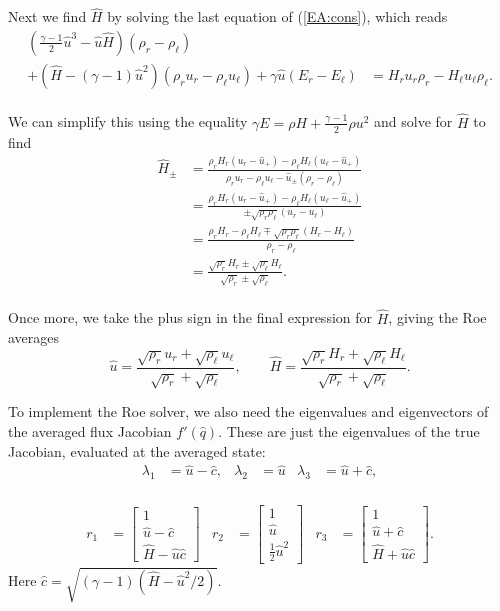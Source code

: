 \documentclass{SIAMbook2016}
\begin{document}
Next we find \(\hat{H}\) by solving the last equation of
(\ref{EA:cons}), which reads\\
\begin{align}
    \left( \frac{\gamma-1}{2}\hat{u}^3 - \hat{u}\hat{H} \right)(\rho_r - \rho_\ell) \\ + \left( \hat{H} - (\gamma-1)\hat{u}^2 \right)(\rho_r u_r - \rho_\ell u_\ell) + \gamma \hat{u}(E_r - E_\ell) & = H_r u_r \rho_r - H_\ell u_\ell \rho_\ell.
\end{align}\\
We can simplify this using the equality
\(\gamma E = \rho H + \frac{\gamma-1}{2}\rho u^2\) and solve for
\(\hat{H}\) to find\\
\begin{align}
    \hat{H}_{\pm} & = \frac{\rho_r H_r (u_r - \hat{u}_+) - \rho_\ell H_\ell (u_\ell - \hat{u}_+)}{\rho_r u_r - \rho_\ell u_\ell - \hat{u}_\pm(\rho_r -\rho_\ell)} \\
    & = \frac{\rho_r H_r (u_r - \hat{u}_+) - \rho_\ell H_\ell (u_\ell - \hat{u}_+)}{\pm\sqrt{\rho_r \rho_\ell}(u_r-u_\ell)} \\
    & = \frac{\rho_r H_r - \rho_\ell H_\ell \mp\sqrt{\rho_r \rho_\ell}(H_r - H_\ell)}{\rho_r - \rho_\ell} \\
    & = \frac{\sqrt{\rho_r}H_r \pm \sqrt{\rho_\ell} H_\ell}{\sqrt{\rho_r}\pm\sqrt{\rho_\ell}}.
\end{align}\\
Once more, we take the plus sign in the final expression for
\(\hat{H}\), giving the Roe averages \[
\hat{u} = \frac{\sqrt{\rho_r} u_r + \sqrt{\rho_\ell} u_\ell}{\sqrt{\rho_r} + \sqrt{\rho_\ell}},
\qquad \hat{H} = \frac{\sqrt{\rho_r}H_r + \sqrt{\rho_\ell} H_\ell}{\sqrt{\rho_r} + \sqrt{\rho_\ell}}.
\]

To implement the Roe solver, we also need the eigenvalues and
eigenvectors of the averaged flux Jacobian \(f'(\hat{q})\). These are
just the eigenvalues of the true Jacobian, evaluated at the averaged
state: \begin{align}
    \lambda_1 & = \hat{u} - \hat{c}, & \lambda_2 & = \hat{u} & \lambda_3 & = \hat{u} + \hat{c},
\end{align}\\
\begin{align}
r_1 & = \begin{bmatrix} 1 \\ \hat{u}-\hat{c} \\ \hat{H}-\hat{u}\hat{c}\end{bmatrix} &
r_2 & = \begin{bmatrix} 1 \\ \hat{u} \\ \frac{1}{2}\hat{u}^2 \end{bmatrix} &
r_3 & = \begin{bmatrix} 1 \\ \hat{u}+\hat{c} \\ \hat{H}+\hat{u}\hat{c}\end{bmatrix}.
\end{align} Here \(\hat{c} = \sqrt{(\gamma-1)(\hat{H}-\hat{u}^2/2)}\).
\end{document}

